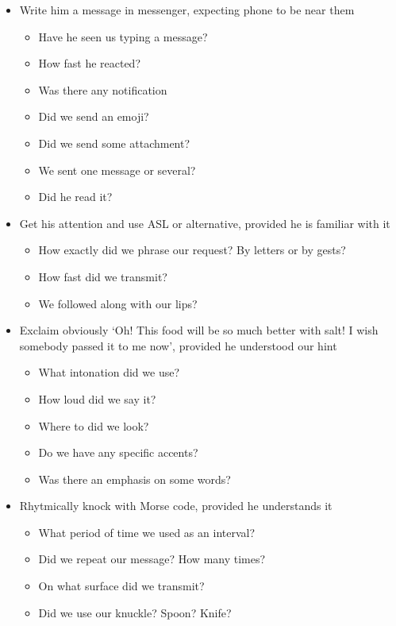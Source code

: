 \documentclass{report}
\begin{document}
\begin{itemize}
                \item Write him a message in messenger, expecting phone to be near them
                \begin{itemize}
                    \item Have he seen us typing a message?
                    \item How fast he reacted?
                    \item Was there any notification
                    \item Did we send an emoji?
                    \item Did we send some attachment?
                    \item We sent one message or several?
                    \item Did he read it?
                \end{itemize}

                \item Get his attention and use ASL or alternative, provided he is familiar with it
                \begin{itemize}
                    \item How exactly did we phrase our request? By letters or by gests?
                    \item How fast did we transmit?
                    \item We followed along with our lips?
                \end{itemize}

                \item Exclaim obviously `Oh! This food will be so much better with salt! I wish somebody passed it to me now', provided he understood our hint
                \begin{itemize}
                    \item What intonation did we use?
                    \item How loud did we say it?
                    \item Where to did we look?
                    \item Do we have any specific accents?
                    \item Was there an emphasis on some words?
                \end{itemize}

                \item Rhytmically knock with Morse code, provided he understands it
                \begin{itemize}
                    \item What period of time we used as an interval?
                    \item Did we repeat our message? How many times?
                    \item On what surface did we transmit?
                    \item Did we use our knuckle? Spoon? Knife?
                \end{itemize}
            \end{itemize}
            
\end{document}
